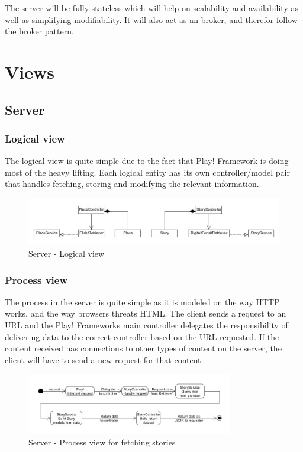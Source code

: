 \documentclass[11pt]{book}
\begin{document}
The server will be fully stateless which will help on scalability and availability as well as simplifying modifiability. It will also act as an broker, and therefor follow the broker pattern.

\section{Views}

\subsection{Server}

\subsubsection{Logical view}
The logical view is quite simple due to the fact that Play! Framework is doing most of the heavy lifting. Each logical entity has its own controller/model pair that handles fetching, storing and modifying the relevant information.

\begin{figure}[H]
      \centering
      \includegraphics[width=1.0\textwidth]{Figures/Architecture/serverLogical.jpg}
      \caption{Server - Logical view}
      \label{fig:arch_server_logical}
\end{figure}

\subsubsection{Process view}
The process in the server is quite simple as it is modeled on the way HTTP works, and the way browsers threats HTML. The client sends a request to an URL and the Play! Frameworks main controller delegates the  responsibility of delivering data to the correct controller based on the URL requested. If the content received has connections to other types of content on the server, the client will have to send a new request for that content.

\begin{figure}[H]
      \centering
      \includegraphics[width=0.8\textwidth]{Figures/Architecture/serverProcessStory.jpg}
      \caption{Server - Process view for fetching stories}
      \label{fig:arch_server_process_story}
\end{figure}
\end{document}
